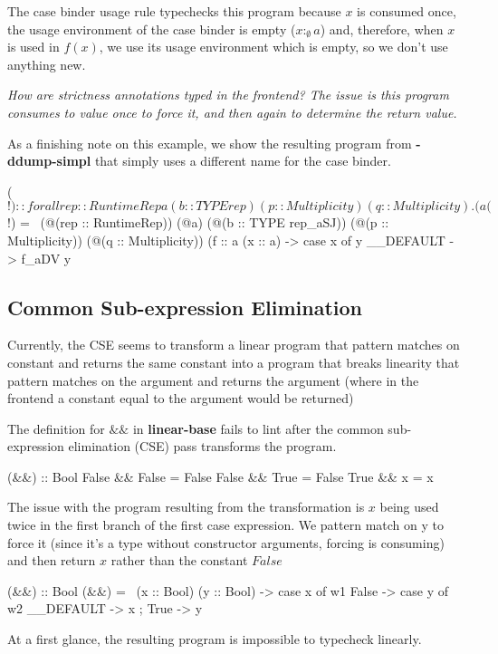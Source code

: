 \documentclass[a4paper, draft]{report}
\begin{document}
%
The case binder usage rule typechecks this program because $x$ is consumed once,
the usage environment of the case binder is empty ($x :_\emptyset a$) and,
therefore, when $x$ is used in $f(x)$, we use its usage environment which is
empty, so we don't use anything new.

\emph{How are strictness annotations typed in the frontend? The issue is this program
consumes to value once to force it, and then again to determine the return
value.}


As a finishing note on this example, we show the resulting program from
\textbf{-ddump-simpl} that simply uses a different name for the case binder.
\begin{code}
($!)
  :: forall {rep :: RuntimeRep} a (b :: TYPE rep)
            (p :: Multiplicity) (q :: Multiplicity).
     (a %
($!)
  = \ (@(rep :: RuntimeRep))
      (@a)
      (@(b :: TYPE rep_aSJ))
      (@(p :: Multiplicity))
      (@(q :: Multiplicity))
      (f :: a %
      (x :: a) ->
      case x of y { __DEFAULT -> f_aDV y }
\end{code}

\subsection{Common Sub-expression Elimination}

Currently, the CSE seems to transform a linear program that pattern matches on
constant and returns the same constant into a program that breaks linearity that
pattern matches on the argument and returns the argument (where in the frontend
a constant equal to the argument would be returned)

The definition for $\&\&$ in \textbf{linear-base} fails to lint after the common
sub-expression elimination (CSE) pass transforms the program.
\begin{code}
(&&) :: Bool %
False && False = False
False && True = False
True && x = x
\end{code}
The issue with the program resulting from the transformation is $x$ being used
twice in the first branch of the first case expression. We pattern match on y to
force it (since it's a type without constructor arguments, forcing is consuming)
and then return $x$ rather than the constant $False$
\begin{code}
(&&) :: Bool %
(&&) = \ (x :: Bool) (y :: Bool) ->
  case x of w1 {
    False -> case y of w2 { __DEFAULT -> x };
    True -> y
  }
\end{code}
At a first glance, the resulting program is impossible to typecheck linearly.
\end{document}

